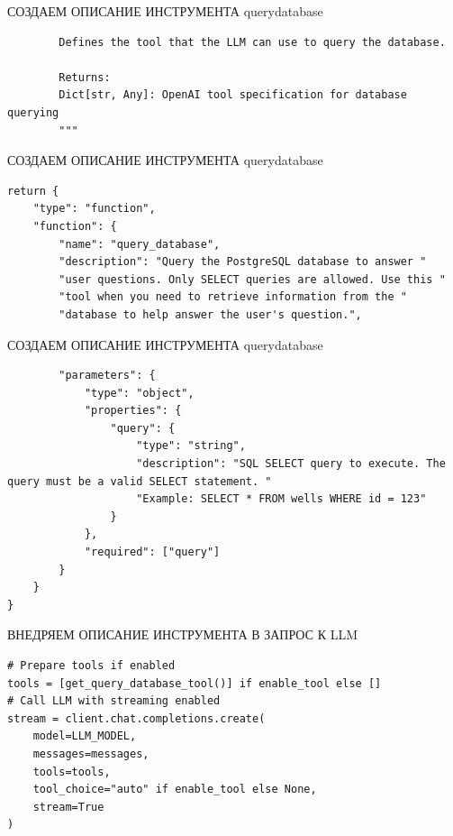 \documentclass[aspectratio=169]{beamer}
\begin{document}
{\begin{frame}[fragile]{СОЗДАЕМ ОПИСАНИЕ ИНСТРУМЕНТА  query\textunderscore database }
\begin{verbatim}
        Defines the tool that the LLM can use to query the database.
        
        Returns:
        Dict[str, Any]: OpenAI tool specification for database querying
        """        
    \end{verbatim}    
    
\end{frame}


\begin{frame}[fragile]{СОЗДАЕМ ОПИСАНИЕ ИНСТРУМЕНТА  query\textunderscore database }
    
    \begin{verbatim}
return {
    "type": "function",
    "function": {
        "name": "query_database",
        "description": "Query the PostgreSQL database to answer "
        "user questions. Only SELECT queries are allowed. Use this "
        "tool when you need to retrieve information from the "
        "database to help answer the user's question.",
    \end{verbatim}            
\end{frame}

\begin{frame}[fragile]{СОЗДАЕМ ОПИСАНИЕ ИНСТРУМЕНТА  query\textunderscore database }
    
    \begin{verbatim}
        "parameters": {
            "type": "object",
            "properties": {
                "query": {
                    "type": "string",
                    "description": "SQL SELECT query to execute. The query must be a valid SELECT statement. "
                    "Example: SELECT * FROM wells WHERE id = 123"
                }
            },
            "required": ["query"]
        }
    }
}

    \end{verbatim}    
\end{frame}
    
    
\begin{frame}[fragile]{ВНЕДРЯЕМ ОПИСАНИЕ ИНСТРУМЕНТА В ЗАПРОС К LLM }
    
\begin{verbatim}    
# Prepare tools if enabled
tools = [get_query_database_tool()] if enable_tool else []
# Call LLM with streaming enabled
stream = client.chat.completions.create(
    model=LLM_MODEL,
    messages=messages,
    tools=tools,
    tool_choice="auto" if enable_tool else None,
    stream=True
)
\end{verbatim}    
\end{frame}


}
\end{document}
